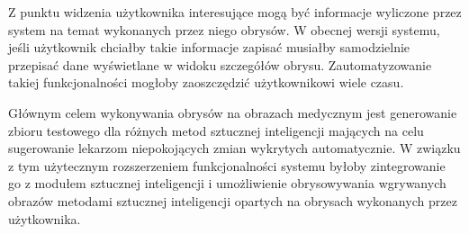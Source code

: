 \documentclass[a4paper,11pt,twoside,openright]{report}
\newcommand\blankpage{%
    \null
    \thispagestyle{empty}%
    \newpage}
\theoremstyle{definition}
\begin{document}
Z punktu widzenia użytkownika interesujące mogą być informacje wyliczone przez
system na temat wykonanych przez niego obrysów. W obecnej wersji systemu, jeśli
użytkownik chciałby takie informacje zapisać musiałby samodzielnie przepisać dane
wyświetlane w widoku szczegółów obrysu. Zautomatyzowanie takiej funkcjonalności
mogłoby zaoszczędzić użytkownikowi wiele czasu.

Głównym celem wykonywania obrysów na obrazach medycznym jest generowanie zbioru
testowego dla różnych metod sztucznej inteligencji mających na celu sugerowanie
lekarzom niepokojących zmian wykrytych automatycznie. W związku z tym użytecznym
rozszerzeniem funkcjonalności systemu byłoby zintegrowanie go z modułem sztucznej
inteligencji i umożliwienie obrysowywania wgrywanych obrazów metodami sztucznej
inteligencji opartych na obrysach wykonanych przez użytkownika.




\afterpage{\blankpage}

\end{document}
